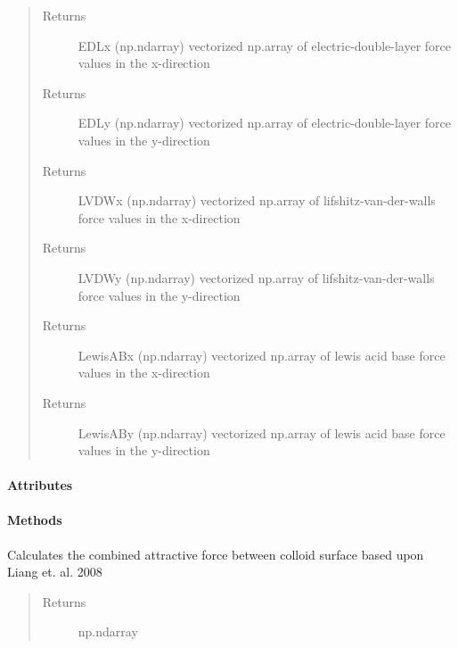 \documentclass[letterpaper,10pt,english]{sphinxmanual}
\begin{document}
\begin{fulllineitems}
\begin{quote}
\begin{description}
\begin{itemize}
\end{itemize}

\end{description}\end{quote}
\begin{quote}\begin{description}
\item[{Returns}] \leavevmode
EDLx (np.ndarray) vectorized np.array of electric-double-layer force values in the x-direction

\item[{Returns}] \leavevmode
EDLy (np.ndarray) vectorized np.array of electric-double-layer force values in the y-direction

\item[{Returns}] \leavevmode
LVDWx (np.ndarray) vectorized np.array of lifshitz-van-der-walls force values in the x-direction

\item[{Returns}] \leavevmode
LVDWy (np.ndarray) vectorized np.array of lifshitz-van-der-walls force values in the y-direction

\item[{Returns}] \leavevmode
LewisABx (np.ndarray) vectorized np.array of lewis acid base force values in the x-direction

\item[{Returns}] \leavevmode
LewisABy (np.ndarray) vectorized np.array of lewis acid base force values in the y-direction

\end{description}\end{quote}
\paragraph{Attributes}
\paragraph{Methods}

\begin{fulllineitems}
\label{\detokenize{index:lb_colloids.Colloids.Colloid_Math.DLVO.attractive_x}}
Calculates the combined attractive force between colloid surface
based upon Liang et. al. 2008
\begin{quote}\begin{description}
\item[{Returns}] \leavevmode
np.ndarray


\end{description}
\end{quote}
\end{fulllineitems}
\end{fulllineitems}
\end{document}
